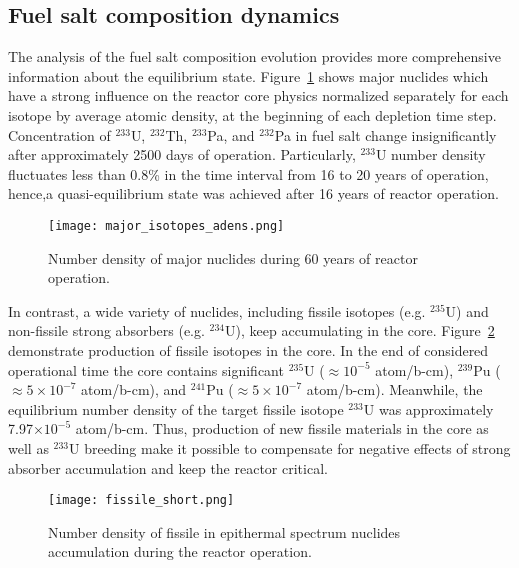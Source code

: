 \subsection{Fuel salt composition dynamics}
The analysis of the fuel salt composition evolution provides more comprehensive information about the equilibrium state. Figure~\ref{fig:adens_eq} shows major nuclides which have a strong influence on the reactor core physics normalized separately for each isotope by average atomic density, at the beginning of each depletion time step. Concentration of $^{233}$U, $^{232}$Th, $^{233}$Pa, and $^{232}$Pa in fuel salt change insignificantly after approximately 2500 days of operation. Particularly, $^{233}$U number density fluctuates less than 0.8\% in the time interval from 16 to 20 years of operation, hence,a quasi-equilibrium state was achieved after 16 years of reactor operation.
\begin{figure}[ht!] %
  \centering
  \texttt{[image: major\_isotopes\_adens.png]}
  \caption{Number density of major nuclides during 60 years of reactor operation.}
  \label{fig:adens_eq}
\end{figure}
In contrast, a wide variety of nuclides, including fissile isotopes (e.g. $^{235}$U) and non-fissile strong absorbers (e.g. $^{234}$U), keep accumulating in the core. Figure~\ref{fig:fissile_short} demonstrate production of fissile isotopes in the core. In the end of considered operational time the core contains significant $^{235}$U ($\approx10^{-5}$ atom/b-cm), $^{239}$Pu ($\approx5\times10^{-7}$ atom/b-cm), and $^{241}$Pu ($\approx 5\times10^{-7}$ atom/b-cm). Meanwhile, the equilibrium number density of the target fissile isotope $^{233}$U was approximately 7.97$\times10^{-5}$ atom/b-cm. Thus, production of new fissile materials in the core as well as $^{233}$U breeding make it possible to compensate for negative effects of strong absorber accumulation and keep the reactor critical.
\begin{figure}[htp!] %
  \centering
  \texttt{[image: fissile\_short.png]}
  \caption{Number density of fissile in epithermal spectrum nuclides accumulation during the reactor operation.}
  \label{fig:fissile_short}
\end{figure}

